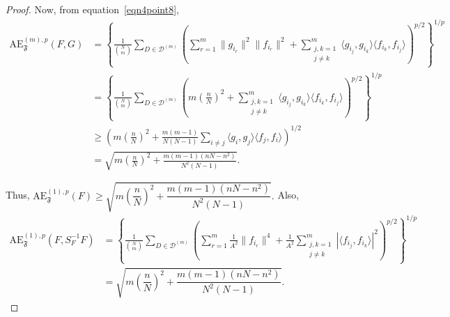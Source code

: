 \documentclass[final,1p,times]{elsarticle}
\begin{document}
\begin{proof}
Now, from equation~\eqref{eqn4point8}, 
\begin{align*}
\mathrm{AE}_{\mathfrak{F}}^{(m),p}(F, G)
&= \left\{ \frac{1}{\binom{N}{m}} \sum_{D \in \mathcal{D}^{(m)}} \left( \sum_{r=1}^m \|g_{i_r}\|^2 \|f_{i_r}\|^2 + \sum_{\substack{j,k=1 \\ j \neq k}}^m \langle g_{i_j}, g_{i_k} \rangle \langle f_{i_k}, f_{i_j} \rangle \right)^{p/2} \right\}^{1/p} \\
&= \left\{ \frac{1}{\binom{N}{m}} \sum_{D \in \mathcal{D}^{(m)}} \left( m \left( \frac{n}{N} \right)^2 + \sum_{\substack{j,k=1 \\ j \neq k}}^m \langle g_{i_j}, g_{i_k} \rangle \langle f_{i_k}, f_{i_j} \rangle \right)^{p/2} \right\}^{1/p} \\
&\geq \left( m \left( \frac{n}{N} \right)^2 + \frac{m(m-1)}{N(N-1)} \sum_{i \neq j} \langle g_i, g_j \rangle \langle f_j, f_i \rangle \right)^{1/2} \\
&= \sqrt{ m\left( \frac{n}{N} \right)^2 + \frac{m(m-1)(nN - n^2)}{N^2(N-1)} }.
\end{align*}

Thus, $\mathrm{AE}_{\mathfrak{F}}^{(1),p}(F) \geq \sqrt{ m\left( \dfrac{n}{N} \right)^2 + \dfrac{m(m-1)(nN - n^2)}{N^2(N-1)} }.$ Also,
\begin{align*}
\mathrm{AE}_{\mathfrak{F}}^{(1),p}(F, S_{F}^{-1}F)
&= \left\{ \frac{1}{\binom{N}{m}} \sum_{D \in \mathcal{D}^{(m)}} \left( \sum_{r=1}^m \frac{1}{A^2} \|f_{i_r}\|^4 + \frac{1}{A^2} \sum_{\substack{j,k=1 \\ j \neq k}}^m |\langle f_{i_j}, f_{i_k} \rangle|^2 \right)^{p/2} \right\}^{1/p} \\
&= \sqrt{ m\left( \dfrac{n}{N} \right)^2 + \dfrac{m(m-1)(nN - n^2)}{N^2(N-1)} }.
\end{align*}


\end{proof}
\end{document}

